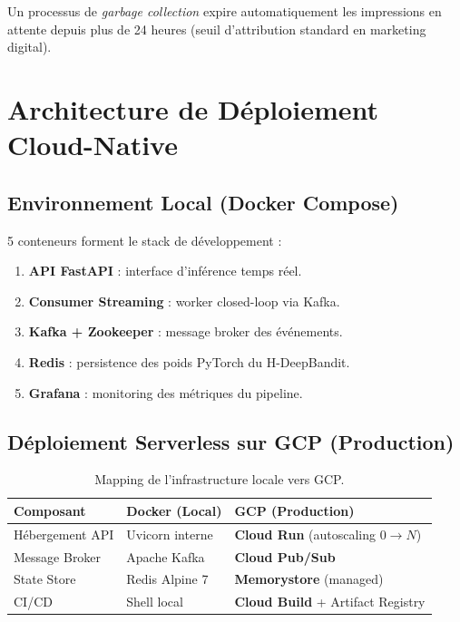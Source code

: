 Un processus de \textit{garbage collection} expire automatiquement les impressions en attente depuis plus de 24 heures (seuil d'attribution standard en marketing digital).

\section{Architecture de Déploiement Cloud-Native}
\label{sec:deploiement_ch4}

\subsection{Environnement Local (Docker Compose)}

5 conteneurs forment le stack de développement :

\begin{enumerate}
    \item \textbf{API FastAPI} : interface d'inférence temps réel.
    \item \textbf{Consumer Streaming} : worker closed-loop via Kafka.
    \item \textbf{Kafka + Zookeeper} : message broker des événements.
    \item \textbf{Redis} : persistence des poids PyTorch \parencite{paszke2019pytorch} du H-DeepBandit.
    \item \textbf{Grafana} : monitoring des métriques du pipeline.
\end{enumerate}

\subsection{Déploiement Serverless sur GCP (Production)}

\begin{table}[H]
    \centering
    \begin{tabular}{l l l}
        \toprule
        \textbf{Composant} & \textbf{Docker (Local)} & \textbf{GCP (Production)} \\
        \midrule
        Hébergement API   & Uvicorn interne             & \textbf{Cloud Run} (autoscaling $0 \to N$) \\
        Message Broker    & Apache Kafka                & \textbf{Cloud Pub/Sub} \\
        State Store       & Redis Alpine 7              & \textbf{Memorystore} (managed) \\
        CI/CD             & Shell local                 & \textbf{Cloud Build} + Artifact Registry \\
        \bottomrule
    \end{tabular}
    \caption{Mapping de l'infrastructure locale vers GCP.}
    \label{tab:mapping_infra_ch4}
\end{table}

